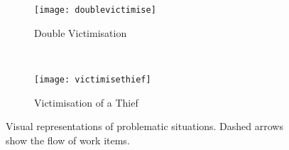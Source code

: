 \begin{figure}[H]
\centering
\begin{subfigure}[b]{0.4\textwidth}
  \centering    
  \texttt{[image: doublevictimise]}
  \caption{
    \tiny Double Victimisation
  }
  \label{fig:doubvict}
\end{subfigure}
~ %
\begin{subfigure}[b]{0.4\textwidth}
  \centering
  \texttt{[image: victimisethief]}
  \caption{
    \tiny Victimisation of a Thief
  }
  \label{fig:victtheif}
\end{subfigure}
\caption{
Visual representations of problematic situations.
Dashed arrows show the flow of work items.
}
\label{fig:problemsit}
\end{figure}


